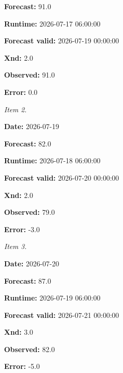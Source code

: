 \documentclass[11pt]{article}
\begin{document}
\par\noindent\textbf{Forecast:} 91.0

\par\noindent\textbf{Runtime:} 2026-07-17 06:00:00

\par\noindent\textbf{Forecast valid:} 2026-07-19 00:00:00

\par\noindent\textbf{Xnd:} 2.0

\par\noindent\textbf{Observed:} 91.0

\par\noindent\textbf{Error:} 0.0

\par\noindent\textit{Item 2.}\par \par\noindent\textbf{Date:} 2026-07-19

\par\noindent\textbf{Forecast:} 82.0

\par\noindent\textbf{Runtime:} 2026-07-18 06:00:00

\par\noindent\textbf{Forecast valid:} 2026-07-20 00:00:00

\par\noindent\textbf{Xnd:} 2.0

\par\noindent\textbf{Observed:} 79.0

\par\noindent\textbf{Error:} -3.0

\par\noindent\textit{Item 3.}\par \par\noindent\textbf{Date:} 2026-07-20

\par\noindent\textbf{Forecast:} 87.0

\par\noindent\textbf{Runtime:} 2026-07-19 06:00:00

\par\noindent\textbf{Forecast valid:} 2026-07-21 00:00:00

\par\noindent\textbf{Xnd:} 3.0

\par\noindent\textbf{Observed:} 82.0

\par\noindent\textbf{Error:} -5.0
\end{document}
